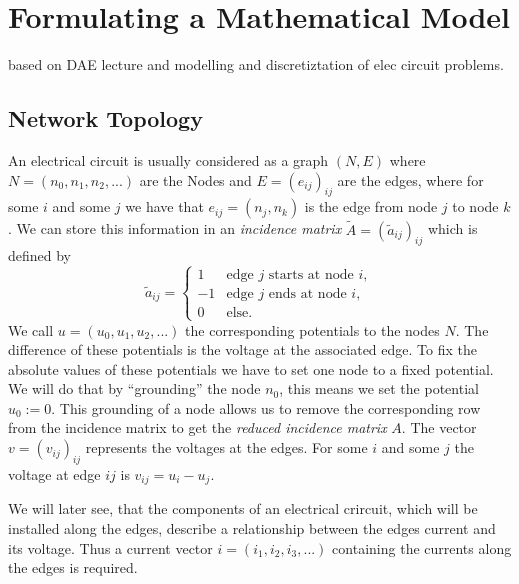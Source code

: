 \chapter{Formulating a Mathematical Model}
based on DAE lecture and modelling and discretiztation of elec circuit problems.


\section{Network Topology}
An electrical circuit is usually considered as a graph $(N,E)$ where $N = (n_0, n_1, n_2, ...)$ are the Nodes and $E = (e_{ij})_{ij}$ are the edges, where for some $i$ and some $j$ we have that $e_{ij} = (n_j, n_k)$ is the edge from node $j$ to node $k$. %
We can store this information in an \emph{incidence matrix} $\tilde{A} = (\tilde{a}_{ij})_{ij}$ which is defined by
\begin{displaymath}
	\tilde{a}_{ij} = 
	\begin{cases}
		1 &   \text{edge $j$ starts at node $i$},\\
		-1 &  \text{edge $j$  ends at node $i$},\\
		0 & \text{else}.				
	\end{cases}
\end{displaymath}
We call $u = (u_0, u_1, u_2, ...)$ the corresponding potentials to the nodes $N$. The difference of these potentials is the voltage at the associated edge. To fix the absolute values of these potentials we have to set one node to a fixed potential. We will do that by ``grounding'' the node $n_0$, this means we set the potential $u_0 := 0$. This grounding of a node allows us to remove the corresponding row from the incidence matrix to get the \emph{reduced incidence matrix} $A$. The vector $v = (v_{ij})_{ij}$ represents the voltages at the edges. For some $i$ and some $j$ the voltage at edge $ij$ is $v_{ij} = u_i - u_j$.

We will later see, that the components of an electrical crircuit, which will be installed along the edges, describe a relationship between the edges current and its voltage. Thus a current vector $i = (i_1, i_2, i_3, ...)$ containing the currents along the edges is required.

